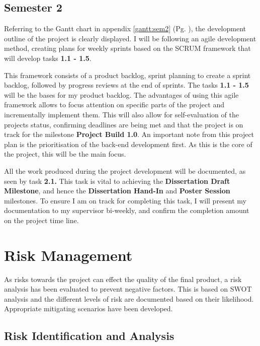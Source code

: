 \subsection{Semester 2}
\label{sec:management:pp:sem2}

\noindent Referring to the Gantt chart in appendix \ref{gantt:sem2} (Pg. \pageref{gantt:sem2}), the development outline of the project is clearly displayed. I will be following an agile development method, creating plans for weekly sprints based on the SCRUM framework that will develop tasks \textbf{1.1 - 1.5}. 

This framework consists of a product backlog, sprint planning to create a sprint backlog, followed by progress reviews at the end of sprints. The tasks \textbf{1.1 - 1.5} will be the bases for my product backlog. The advantages of using this agile framework allows to focus attention on specific parts of the project and incrementally implement them. This will also allow for self-evaluation of the projects status, confirming deadlines are being met and that the project is on track for the milestone \textbf{Project Build 1.0}. An important note from this project plan is the prioritisation of the back-end development first. As this is the core of the project, this will be the main focus.

All the work produced during the project development will be documented, as seen by task \textbf{2.1.} This task is vital to achieving the \textbf{Dissertation Draft Milestone}, and hence the \textbf{Dissertation Hand-In} and \textbf{Poster Session} milestones. To ensure I am on track for completing this task, I will present my documentation to my supervisor bi-weekly, and confirm the completion amount on the project time line. 


\section{Risk Management}
\label{sec:management:ra}

\noindent As risks towards the project can effect the quality of the final product, a risk analysis has been evaluated to prevent negative factors. This is based on SWOT analysis and the different levels of risk are documented based on their likelihood. Appropriate mitigating scenarios have been developed.

\subsection{Risk Identification and Analysis}

